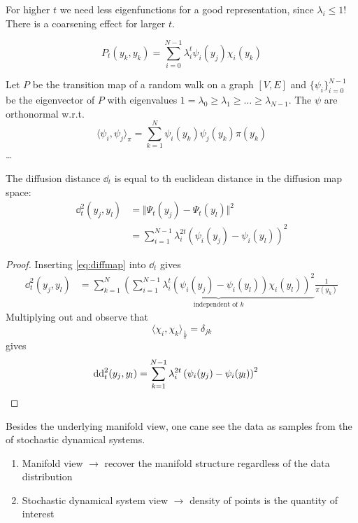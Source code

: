 \begin{aremark}
    For higher $t$ we need less eigenfunctions for a good representation, since $\lambda_i\leq 1$!
    There is a coarsening effect for larger $t$.
\end{aremark}


\begin{equation}\label{eq:diffmap}
    P_t(y_k,y_k)=\sum_{i=0}^{N-1}\lambda_i^t\psi_i(y_j)\chi_i(y_k)
\end{equation}

\begin{*definition}\label{def:2.27b}
    Let $P$ be the transition map of a random walk on a graph $[V,E]$ and $\{\psi_i\}_{i=0}^{N-1}$ be the 
    eigenvector of $P$ with eigenvalues $1=\lambda_0\geq\lambda_1\geq \dots\geq\lambda_{N-1}$. The $\psi$ are orthonormal w.r.t.
    \[\langle \psi_i,\psi_j\rangle_{\pi}= \sum_{k=1}^N\psi_i(y_k)\psi_j(y_k)\pi(y_k)\]
    \dots
\end{*definition}

\begin{theorem}\label{thm:2.28}
    The diffusion distance $\dd_t$ is equal to th euclidean distance in the diffusion map space:
    \begin{align*}
        \dd_t^2(y_j,y_l)&=\Vert \Psi_t(y_j)-\Psi_t(y_l)\Vert^2\\
        &=\sum_{i=1}^{N-1}\lambda_i^{2t}\left(\psi_i(y_j)-\psi_i(y_l)\right)^2
    \end{align*}    
\end{theorem}

\begin{proof}
    Inserting \ref{eq:diffmap} into $\dd_t$ gives 
    \begin{align*}
        \dd_t^2(y_j,y_l)&=\sum_{k=1}^{N}\underbrace{\left(\sum_{i=1}^{N-1}\lambda_i^t(\psi_i(y_j)-\psi_i(y_l))\chi_i(y_l)\right)^2}_{\text{independent of }k}\frac{1}{\pi(y_k)}
    \end{align*}
    Multiplying out and observe that 
    \[\langle\chi_i,\chi_k\rangle_{\frac{1}{\pi}}=\delta_{jk}\]
    gives 
    \begin{align*}
        {\text{dd}}_t^2(y_j,y_l)&=\sum_{k=1}^{N-1}\lambda_i^{2t}\left(\psi_i(y_j)-\psi_i(y_l)\right)^2\qedhere
    \end{align*}
\end{proof}

Besides the underlying manifold view, one cane see the data as 
samples from the  of stochastic dynamical systems.
\begin{enumerate}
    \item Manifold view $\to $ recover the manifold structure regardless of the data distribution
    \item Stochastic dynamical system view $\to$ density of points is the quantity of interest
\end{enumerate}

